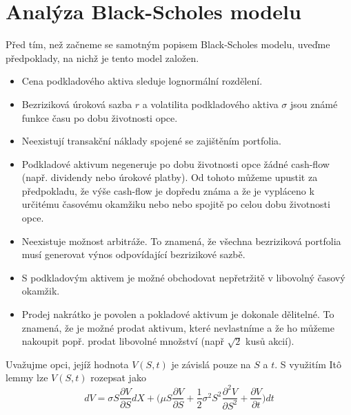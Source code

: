 \documentclass[a4paper]{book}
\begin{document}
\section{Analýza Black-Scholes modelu}

Před tím, než začneme se samotným popisem Black-Scholes modelu, uveďme předpoklady, na nichž je tento model založen.
\begin{itemize}
\item Cena podkladového aktiva sleduje lognormální rozdělení.
\item Bezriziková úroková sazba $r$ a volatilita podkladového aktiva $\sigma$ jsou známé funkce času po dobu životnosti opce.
\item Neexistují transakční náklady spojené se zajištěním portfolia.
\item Podkladové aktivum negeneruje po dobu životnosti opce žádné cash-flow (např. dividendy nebo úrokové platby). Od tohoto můžeme upustit za předpokladu, že výše cash-flow je dopředu známa a že je vypláceno k určitému časovému okamžiku nebo nebo spojitě po celou dobu životnosti opce.
\item Neexistuje možnost arbitráže. To znamená, že všechna bezriziková portfolia musí generovat výnos odpovídající bezrizikové sazbě.
\item S podkladovým aktivem je možné obchodovat nepřetržitě v libovolný časový okamžik.
\item Prodej nakrátko je povolen a pokladové aktivum je dokonale dělitelné. To znamená, že je možné prodat aktivum, které nevlastníme a že ho můžeme nakoupit popř. prodat libovolné množství (např $\sqrt{2}$ kusů akcií).
\end{itemize}

Uvažujme opci, jejíž hodnota $V(S,t)$ je závislá pouze na $S$ a $t$. S využitím It\^o lemmy lze $V(S,t)$ rozepsat jako
\begin{equation*}
dV = \sigma S \frac{\partial V}{\partial S}dX + \Bigg( \mu S \frac{\partial V}{\partial S} + \frac{1}{2}\sigma^2 S^2 \frac{\partial^2V}{\partial S^2} + \frac{\partial V}{\partial t} \Bigg)dt
\end{equation*}
\end{document}
